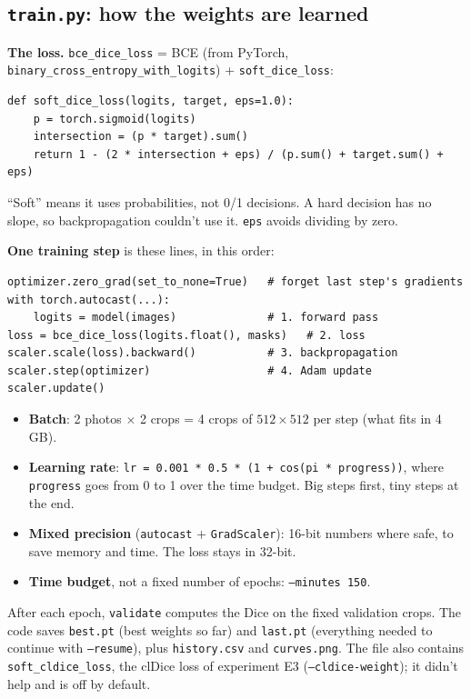 \subsection{\texttt{train.py}: how the weights are learned}

\textbf{The loss.} \texttt{bce\_dice\_loss} = BCE (from PyTorch, \texttt{binary\_cross\_entropy\_with\_logits}) + \texttt{soft\_dice\_loss}:
\begin{small}\begin{verbatim}
def soft_dice_loss(logits, target, eps=1.0):
    p = torch.sigmoid(logits)
    intersection = (p * target).sum()
    return 1 - (2 * intersection + eps) / (p.sum() + target.sum() + eps)
\end{verbatim}
\end{small}
``Soft'' means it uses probabilities, not 0/1 decisions. A hard decision has no slope, so backpropagation couldn't use it. \texttt{eps} avoids dividing by zero.

\textbf{One training step} is these lines, in this order:
\begin{small}\begin{verbatim}
optimizer.zero_grad(set_to_none=True)   # forget last step's gradients
with torch.autocast(...):
    logits = model(images)              # 1. forward pass
loss = bce_dice_loss(logits.float(), masks)   # 2. loss
scaler.scale(loss).backward()           # 3. backpropagation
scaler.step(optimizer)                  # 4. Adam update
scaler.update()
\end{verbatim}
\end{small}
\begin{itemize}
  \item \textbf{Batch}: 2 photos $\times$ 2 crops = 4 crops of $512\times512$ per step (what fits in 4\,GB).
  \item \textbf{Learning rate}: \texttt{lr = 0.001 * 0.5 * (1 + cos(pi * progress))}, where \texttt{progress} goes from 0 to 1 over the time budget. Big steps first, tiny steps at the end.
  \item \textbf{Mixed precision} (\texttt{autocast} + \texttt{GradScaler}): 16-bit numbers where safe, to save memory and time. The loss stays in 32-bit.
  \item \textbf{Time budget}, not a fixed number of epochs: \texttt{--minutes 150}.
\end{itemize}

After each epoch, \texttt{validate} computes the Dice on the fixed validation crops. The code saves \texttt{best.pt} (best weights so far) and \texttt{last.pt} (everything needed to continue with \texttt{--resume}), plus \texttt{history.csv} and \texttt{curves.png}. The file also contains \texttt{soft\_cldice\_loss}, the clDice loss of experiment E3 (\texttt{--cldice-weight}); it didn't help and is off by default.

